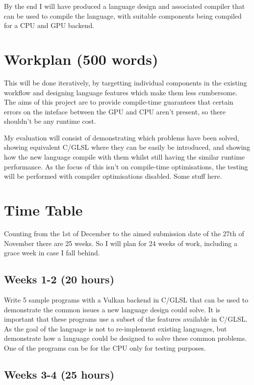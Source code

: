\documentclass[11pt]{article}
\begin{document}
By the end I will have produced a language design and associated compiler that
can be used to compile the language, with suitable components being compiled
for a CPU and GPU backend.

\section{Workplan (500 words)}


This will be done iteratively,
by targetting individual components in the existing workflow and designing
language features which make them less cumbersome. The aims of this project are
to provide compile-time guarantees that certain errors on the inteface between
the GPU and CPU aren't present, so there shouldn't be any runtime cost.

My evaluation will consist of demonstrating which problems have been solved,
showing equivalent C/GLSL where they can be easily be introduced, and showing
how the new language  compile with them whilst still having the
similar runtime performance. As the focus of this isn't on compile-time
optimisations, the testing will be performed with compiler optimisations
disabled.
Some stuff here.




\newpage
\appendix

\section{Time Table}

Counting from the 1st of December to the aimed submission date of the 27th of
November there are 25 weeks. So I will plan for 24 weeks of work, including a
grace week in case I fall behind.

\subsection{Weeks 1-2 (20 hours)}

Write 5 sample programs with a Vulkan backend in C/GLSL that can be used to
demonstrate the common issues a new language design could solve. It is
important that these programs use a subset of the features available in C/GLSL.
As the goal of the language is not to re-implement existing languages, but
demonstrate how a language could be designed to solve these common problems.
One of the programs can be for the CPU only for testing purposes.

\subsection{Weeks 3-4 (25 hours)}
\end{document}
